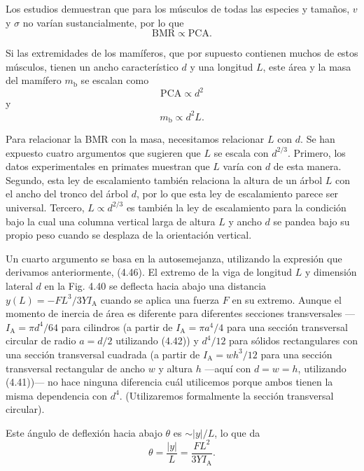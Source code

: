 \documentclass[12pt]{book}
\begin{document}
Los estudios demuestran que para los músculos de todas las especies y tamaños, $v$ y $\sigma$ no varían sustancialmente, por lo que
\begin{equation}
\text{BMR} \propto \text{PCA}.
\label{eq:621}
\end{equation}

Si las extremidades de los mamíferos, que por supuesto contienen muchos de estos músculos, tienen un ancho característico $d$ y una longitud $L$, este área y la masa del mamífero $m_{\text{b}}$ se escalan como
\begin{equation}
\text{PCA} \propto d^2
\label{eq:622}
\end{equation}
y
\begin{equation}
m_{\text{b}} \propto d^2 L.
\label{eq:623}
\end{equation}

Para relacionar la BMR con la masa, necesitamos relacionar $L$ con $d$. Se han expuesto cuatro argumentos que sugieren que $L$ se escala con $d^{2/3}$. Primero, los datos experimentales en primates muestran que $L$ varía con $d$ de esta manera. Segundo, esta ley de escalamiento también relaciona la altura de un árbol $L$ con el ancho del tronco del árbol $d$, por lo que esta ley de escalamiento parece ser universal. Tercero, $L \propto d^{2/3}$ es también la ley de escalamiento para la condición bajo la cual una columna vertical larga de altura $L$ y ancho $d$ se pandea bajo su propio peso cuando se desplaza de la orientación vertical.

Un cuarto argumento se basa en la autosemejanza, utilizando la expresión que derivamos anteriormente, (4.46). El extremo de la viga de longitud $L$ y dimensión lateral $d$ en la Fig. 4.40 se deflecta hacia abajo una distancia $y(L) = -FL^3/3Y I_{\text{A}}$ cuando se aplica una fuerza $F$ en su extremo. Aunque el momento de inercia de área es diferente para diferentes secciones transversales ---$I_{\text{A}} = \pi d^4/64$ para cilindros (a partir de $I_{\text{A}} = \pi a^4/4$ para una sección transversal circular de radio $a = d/2$ utilizando (4.42)) y $d^4/12$ para sólidos rectangulares con una sección transversal cuadrada (a partir de $I_{\text{A}} = wh^3/12$ para una sección transversal rectangular de ancho $w$ y altura $h$ ---aquí con $d = w = h$, utilizando (4.41))--- no hace ninguna diferencia cuál utilicemos porque ambos tienen la misma dependencia con $d^4$. (Utilizaremos formalmente la sección transversal circular).

Este ángulo de deflexión hacia abajo $\theta$ es $\sim |y|/L$, lo que da
\begin{equation}
\theta = \frac{|y|}{L} = \frac{F L^2}{3 Y I_{\text{A}}}.
\label{eq:624}
\end{equation}
\end{document}
